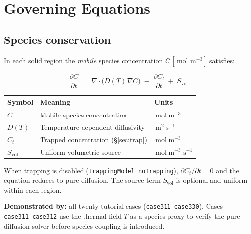 \documentclass[11pt,a4paper]{article}
\newcommand{\pder}[2]{\frac{\partial #1}{\partial #2}}
\newcommand{\mol}{\,\text{mol}}
\newcommand{\m}{\,\text{m}}
\newcommand{\s}{\,\text{s}}
\newcommand{\caseref}[1]{\texttt{\color{casegreen}#1}}
\begin{document}
\section{Governing Equations}
\label{sec:gov}

\subsection{Species conservation}
\label{sec:species}

In each solid region the \emph{mobile} species concentration
$C\,[\mol\,\m^{-3}]$ satisfies:

\begin{tcolorbox}[eqbox,title={Species equation — every solid region}]
\begin{equation}\label{eq:species}
  \pder{C}{t}
  \;=\;
  \nabla\cdot\!\bigl(D(T)\,\nabla C\bigr)
  \;-\; \pder{C_t}{t}
  \;+\; S_\text{vol}
\end{equation}
\end{tcolorbox}

\begin{center}
\begin{tabular}{lll}
\toprule
Symbol & Meaning & Units \\
\midrule
$C$       & Mobile species concentration      & $\mol\,\m^{-3}$ \\
$D(T)$    & Temperature-dependent diffusivity  & $\m^2\,\s^{-1}$ \\
$C_t$     & Trapped concentration (§\ref{sec:trap}) & $\mol\,\m^{-3}$ \\
$S_\text{vol}$ & Uniform volumetric source     & $\mol\,\m^{-3}\,\s^{-1}$ \\
\bottomrule
\end{tabular}
\end{center}

When trapping is disabled (\texttt{trappingModel noTrapping}), $\partial C_t/\partial t = 0$
and the equation reduces to pure diffusion.  The source term $S_\text{vol}$ is
optional and uniform within each region.

\begin{tcolorbox}[casebox]
  \textbf{Demonstrated by:} all twenty tutorial cases
  (\caseref{case311}–\caseref{case330}).
  Cases \caseref{case311}–\caseref{case312} use the thermal field $T$ as a
  species proxy to verify the pure-diffusion solver before species coupling is
  introduced.
\end{tcolorbox}
\end{document}
